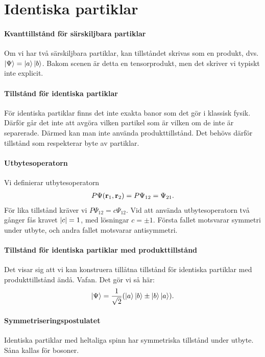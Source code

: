 \section{Identiska partiklar}

\paragraph{Kvanttillstånd för särskiljbara partiklar}
Om vi har två särskiljbara partiklar, kan tillståndet skrivas som en produkt, dvs. $\ket{\Psi} = \ket{a}\ket{b}$. Bakom scenen är detta en tensorprodukt, men det skriver vi typiskt inte explicit.

\paragraph{Tillstånd för identiska partiklar}
För identiska partiklar finns det inte exakta banor som det gör i klassisk fysik. Därför går det inte att avgöra vilken partikel som är vilken om de inte är separerade. Därmed kan man inte använda produkttillstånd. Det behövs därför tillstånd som respekterar byte av partiklar.

\paragraph{Utbytesoperatorn}
Vi definierar utbytesoperatorn
\begin{align*}
	P\Psi(\vb{r}_{1}, \vb{r}_{2}) = P\Psi_{12} = \Psi_{21}.
\end{align*}
För lika tillstånd kräver vi $P\Psi_{12} = c\Psi_{12}$. Vid att använda utbytesoperatorn två gånger fås kravet $\abs{c} = 1$, med lösningar $c = \pm 1$. Första fallet motsvarar symmetri under utbyte, och andra fallet motsvarar antisymmetri.

\paragraph{Tillstånd för identiska partiklar med produkttillstånd}
Det visar sig att vi kan konstruera tillåtna tillstånd för identiska partiklar med produkttillstånd ändå. Vafan. Det gör vi så här:
\begin{align*}
	\ket{\Psi} = \frac{1}{\sqrt{2}}(\ket{a}\ket{b} \pm \ket{b}\ket{a}).
\end{align*}

\paragraph{Symmetriseringspostulatet}
Identiska partiklar med heltaliga spinn har symmetriska tillstånd under utbyte. Såna kallas för bosoner.

